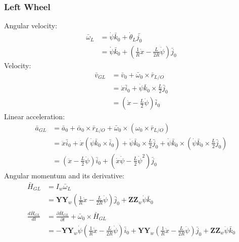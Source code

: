 \documentclass[a4paper,10pt]{article}
\begin{document}
\subsubsection{Left Wheel}
Angular velocity:
\begin{align}
 \bar{\omega}_L &= \dot\psi\bar{k}_0 + \dot\theta_L\bar{j_0} \nonumber \\
 &= \dot\psi\bar{k}_0 + \left(\frac{1}{R}\dot{x}-\frac{L}{2R}\dot\psi\right)\bar{j}_0 \label{kanesLHSVariableStart}
\end{align}
Velocity:
\begin{align}
  \bar{v}_{GL} &= \bar{v}_0 + \bar{\omega}_0 \times \bar{r}_{L/O} \nonumber \\
 &= \dot{x}\bar{i}_0 + \dot\psi\bar{k}_0 \times \frac{L}{2}\bar{j}_0 \nonumber \\
 &= \left(\dot{x}-\frac{L}{2}\dot\psi\right)\bar{i}_0  
\end{align}
Linear acceleration:
\begin{align}
 \bar{a}_{GL} &= \bar{a}_0 + \bar\alpha_0 \times \bar{r}_{L/O} + \bar\omega_0 \times \left( \omega_0 \times \bar{r}_{L/O}\right) \nonumber \\
 &= \ddot{x}\bar{i}_0 + \dot{x}\left(\dot\psi\bar{k}_0 \times \bar{i}_0\right)+ \ddot\psi\bar{k}_0 \times \frac{L}{2}\bar{j}_0 + \dot\psi\bar{k}_0 \times \left( \dot\psi\bar{k}_0 \times \frac{L}{2}\bar{j}_0\right) \nonumber \\
 &= \left(\ddot{x}-\frac{L}{2}\ddot\psi\right)\bar{i}_0 + \left(\dot{x}\dot\psi- \frac{L}{2}\dot\psi^2\right)\bar{j}_0  
\end{align}
Angular momentum and its derivative:
\begin{align}
 \bar{H}_{GL} &= I_w\bar{\omega}_L \nonumber \\
 &= \mathbf{YY}_w\left(\frac{1}{R}\dot{x}-\frac{L}{2R}\dot\psi\right)\bar{j}_0 + \mathbf{ZZ}_w\dot\psi\bar{k}_0\nonumber \\
 \frac{d\bar{H}_{GL}}{dt} &= \frac{\partial \bar{H}_{GL}}{\partial t} + \bar\omega_0 \times \bar{H}_{GL} \nonumber \\
 &=  -\mathbf{YY}_w\dot\psi\left(\frac{1}{R}\dot{x} - \frac{L}{2R}\dot\psi\right)\bar{i}_0
     + \mathbf{YY}_w\left(\frac{1}{R}\ddot{x} - \frac{L}{2R}\ddot\psi\right)\bar{j}_0
                         + \mathbf{ZZ}_w\ddot\psi\bar{k}_0 
\end{align}
\end{document}
